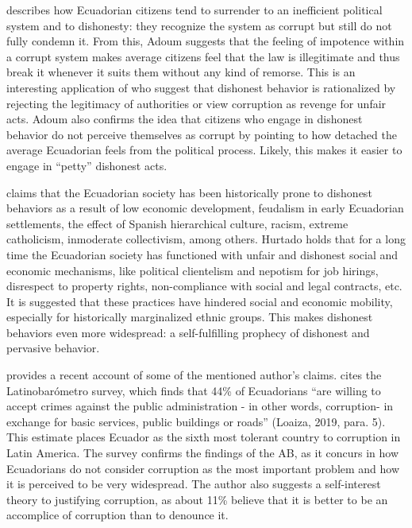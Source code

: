 \documentclass[12pt,a4]{article}\usepackage[]{graphicx}\usepackage[]{xcolor}
\begin{document}
\textcite{Adoum.2000} describes how Ecuadorian citizens tend to surrender to an inefficient political system and to dishonesty: they recognize the system as corrupt but still do not fully condemn it. From this, Adoum suggests that the feeling of impotence within a corrupt system makes average citizens feel that the law is illegitimate and thus break it whenever it suits them without any kind of remorse. This is an interesting application of \textcite{Ashforth.2003} who suggest that dishonest behavior is rationalized by rejecting the legitimacy of authorities or view corruption as revenge for unfair acts. Adoum also confirms the idea that citizens who engage in dishonest behavior do not perceive themselves as corrupt by pointing to how detached the average Ecuadorian feels from the political process. Likely, this makes it easier to engage in \enquote{petty} dishonest acts.

\textcite{Hurtado.2007} claims that the Ecuadorian society has been historically prone to dishonest behaviors as a result of low economic development, feudalism in early Ecuadorian settlements, the effect of Spanish hierarchical culture, racism, extreme catholicism, inmoderate collectivism, among others. Hurtado holds that for a long time the Ecuadorian society has functioned with unfair and dishonest social and economic mechanisms, like political clientelism and nepotism for job hirings, disrespect to property rights, non-compliance with social and legal contracts, etc. It is suggested that these practices have hindered social and economic mobility, especially for historically marginalized ethnic groups. This makes dishonest behaviors even more widespread: a self-fulfilling prophecy of dishonest and pervasive behavior. 

\textcite{Loaiza.2019} provides a recent account of some of the mentioned author's claims. \textcite{Loaiza.2019} cites the Latinobarómetro survey, which finds that 44\% of Ecuadorians \enquote{are willing to accept crimes against the public administration - in other words, corruption- in exchange for basic services, public buildings or roads} (Loaiza, 2019, para. 5). This estimate places Ecuador as the sixth most tolerant country to corruption in Latin America. The survey confirms the findings of the AB, as it concurs in how Ecuadorians do not consider corruption as the most important problem and how it is perceived to be very widespread. The author also suggests a self-interest theory to justifying corruption, as about 11\% believe that it is better to be an accomplice of corruption than to denounce it. 
\end{document}
